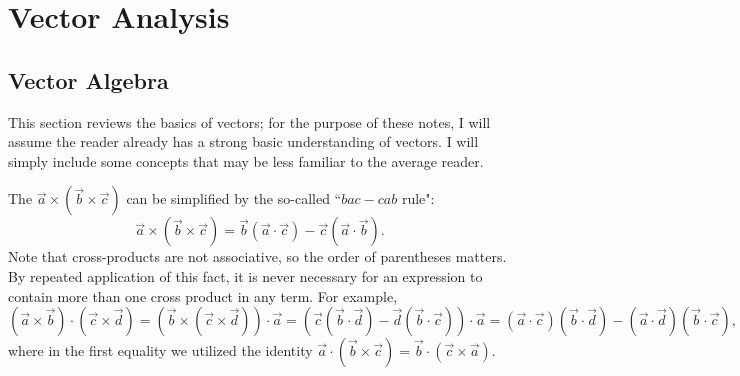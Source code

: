 \chapter{Vector Analysis}

\section{Vector Algebra}

This section reviews the basics of vectors; for the purpose of these notes, I will assume the reader already has a strong basic understanding of vectors. I will simply include some concepts that may be less familiar to the average reader.

The  $\vec{a}\times (\vec{b}\times \vec{c})$ can be simplified by the so-called ``$bac-cab$ rule":
\[\vec{a}\times(\vec{b}\times\vec{c})=\vec{b}(\vec{a}\cdot\vec{c})-\vec{c}(\vec{a}\cdot\vec{b}).\]
Note that cross-products are not associative, so the order of parentheses matters. By repeated application of this fact, it is never necessary for an expression to contain more than one cross product in any term. For example,
\[(\vec{a}\times \vec{b})\cdot(\vec{c}\times\vec{d})=(\vec{b}\times(\vec{c}\times \vec{d}))\cdot \vec{a}=(\vec{c}(\vec{b}\cdot\vec{d})-\vec{d}(\vec{b}\cdot\vec{c}))\cdot\vec{a}=(\vec{a}\cdot\vec{c})(\vec{b}\cdot\vec{d})-(\vec{a}\cdot\vec{d})(\vec{b}\cdot\vec{c}),\]
where in the first equality we utilized the  identity $\vec{a}\cdot(\vec{b}\times\vec{c})=\vec{b}\cdot(\vec{c}\times\vec{a})$.